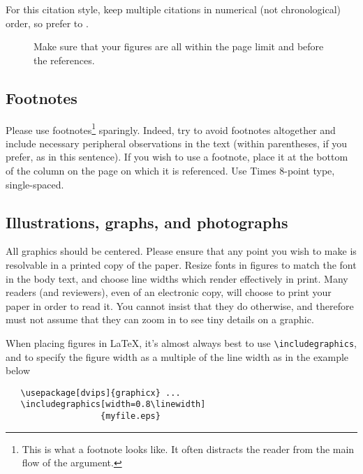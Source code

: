 \documentclass[10pt,twocolumn,letterpaper]{article}
\begin{document}
For this citation style, keep multiple citations in numerical (not
chronological) order, so prefer \cite{Alpher03,Alpher02,Authors14} to
\cite{Alpher02,Alpher03,Authors14}.


\begin{figure*}
\begin{center}
\fbox{\rule{0pt}{2in} \rule{.9\linewidth}{0pt}}
\end{center}
   \caption{Make sure that your figures are all within the page limit and before the references.}
\label{fig:short}
\end{figure*}


\subsection{Footnotes}

Please use footnotes\footnote {This is what a footnote looks like.  It
often distracts the reader from the main flow of the argument.} sparingly.
Indeed, try to avoid footnotes altogether and include necessary peripheral
observations in
the text (within parentheses, if you prefer, as in this sentence).  If you
wish to use a footnote, place it at the bottom of the column on the page on
which it is referenced. Use Times 8-point type, single-spaced.

\subsection{Illustrations, graphs, and photographs}

All graphics should be centered.  Please ensure that any point you wish to
make is resolvable in a printed copy of the paper.  Resize fonts in figures
to match the font in the body text, and choose line widths which render
effectively in print.  Many readers (and reviewers), even of an electronic
copy, will choose to print your paper in order to read it.  You cannot
insist that they do otherwise, and therefore must not assume that they can
zoom in to see tiny details on a graphic.

When placing figures in \LaTeX, it's almost always best to use
\verb+\includegraphics+, and to specify the  figure width as a multiple of
the line width as in the example below
{\small\begin{verbatim}
   \usepackage[dvips]{graphicx} ...
   \includegraphics[width=0.8\linewidth]
                   {myfile.eps}
\end{verbatim}
}


{\small


}
\end{document}
